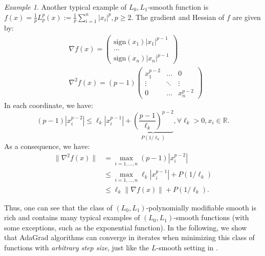 \documentclass{article}
\theoremstyle{plain}
\theoremstyle{definition}
\theoremstyle{remark}
\newtheorem{example}[theorem]{Example}
\newcommand*{\RR}{\mathbb{R}}
\begin{document}
\begin{example}
    \label{ex:Lp-norm-is-good}
    Another typical example of $L_0,L_1$-smooth function is $f(x) = \frac{1}{p} L_p^p(x) := \frac{1}{p}\sum_{i = 1}^n |x_i|^p, p \geq 2$.
    The gradient and Hessian of $f$ are given by:
    \begin{align*}
        & \nabla f(x) = \begin{pmatrix}
            \mathrm{sign}(x_1) |x_1|^{p - 1} \\ \ldots \\ \mathrm{sign}(x_n) |x_n|^{p - 1}
        \end{pmatrix} \\
        & \nabla^2 f(x) = (p-1) \begin{pmatrix}
            x_1^{p - 2} & \ldots & 0 \\
            \vdots & \ddots & \vdots \\
            0 & \ldots & x_n^{p - 2}
        \end{pmatrix}
    \end{align*}
    In each coordinate, we have:
    \begin{equation*}
        (p - 1)\left|x_i^{p - 2}\right| \leq \ell_k|x_i^{p - 1}| + \underbrace{\left(\frac{p - 1}{\ell_k}\right)^{p - 2}}_{P(1/\ell_k)}, \forall \ell_k > 0, x_i \in \RR.
    \end{equation*}
    As a consequence, we have:
    \begin{equation*}
        \begin{aligned}
            \|\nabla^2 f(x)\| &= \max_{i = 1, \ldots, n} (p-1)|x_i^{p-2}|\\
            &\leq \max_{i = 1, \ldots,n} \ell_k |x_i^{p - 1}| + P(1/\ell_k) \\
            &\leq \ell_k \|\nabla f(x)\| + P(1/\ell_k).
        \end{aligned}
    \end{equation*}
\end{example}

Thus, one can see that the class of $(L_0,L_1)$-polynomially modifiable smooth is rich and contains many typical examples of $(L_0,L_1)$-smooth functions (with some exceptions, such as the exponential function). In the following, we show that AdaGrad algorithms can converge in iterates when minimizing this class of functions with \emph{arbitrary step size}, just like the $L$-smooth setting in \cite{traore2021sequential}.
\end{document}
